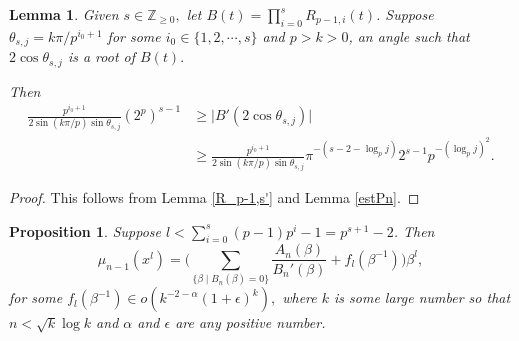 \documentclass[11 pt]{amsart}
\theoremstyle{plain}
\newtheorem{lemma}[thm]{Lemma}
\newtheorem{prop}[thm]{Proposition}
\theoremstyle{definition}
\theoremstyle{remark}
\def\Z{\mathbb{Z}}
\def\b{\beta}
\def\m{\mu}
\begin{document}
\begin{lemma} \label{estR'}
    Given $s \in \Z_{\ge 0},$ let $B(t)=\prod_{i=0}^s R_{p-1, i}(t)$. Suppose $\theta_{s,j}=k\pi/p^{i_0+1}$ for some $i_0 \in \{1, 2, \cdots, s\}$ and $p>k>0$, an angle such that $2\cos \theta_{s,j}$ is a root of $B(t).$

    Then \begin{align*}
        \frac{p^{i_0+1}}{2\sin(k\pi/p)\sin \theta_{s, j}}(2^p)^{s-1} &\ge \vert B'(2 \cos \theta_{s, j}) \vert \\ &\ge  \frac{p^{i_0+1}}{2\sin(k\pi/p)\sin \theta_{s, j}}\pi^{-(s-2-\log_pj )}2^{s-1} p^{-(\log_p j)^2}.
    \end{align*}
\end{lemma}

\begin{proof}
    This follows from Lemma \ref{R_p-1,s'} and Lemma \ref{estPn}.
\end{proof}


\begin{prop} \label{m_ninbest}
    Suppose $l < \sum_{i=0}^s (p-1)p^{i}-1=p^{s+1}-2$. Then $$\m_{n-1}(x^l)=\bigg(\sum_{\{\b \mid B_n(\b)=0\}}\frac{A_n(\b)}{B_n'(\b)}+f_l(\b^{-1}) \bigg)\b^l,$$
        for some $f_l(\b^{-1}) \in o(k^{-2-\alpha}(1+\epsilon)^k),$        where $k$ is some large number so that $n < \sqrt{k} \log k$ and  $\alpha$ and $\epsilon$ are any positive number.   
\end{prop}
\end{document}
